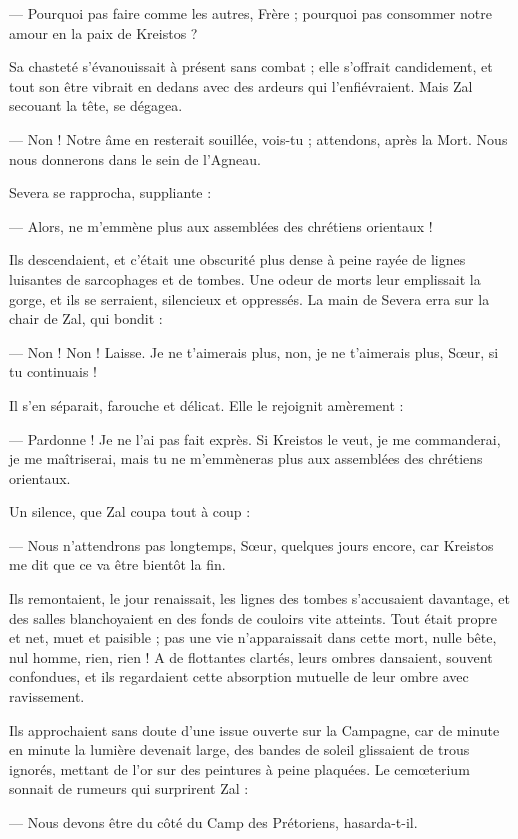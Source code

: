 \documentclass[a4paper, 11pt, oneside, polutonikogreek, french]{article}
\begin{document}
--- Pourquoi pas faire comme les autres, Frère ; pourquoi pas consommer notre amour en la paix de Kreistos ?

Sa chasteté s'évanouissait à présent sans combat ; elle s'offrait candidement, et tout son être vibrait en dedans avec des ardeurs qui l'enfiévraient. Mais Zal secouant la tête, se dégagea.

--- Non ! Notre âme en resterait souillée, vois-tu ; attendons, après la Mort. Nous nous donnerons dans le sein de l'Agneau.

Severa se rapprocha, suppliante :

--- Alors, ne m'emmène plus aux assemblées des chrétiens orientaux !

Ils descendaient, et c'était une obscurité plus dense à peine rayée de lignes luisantes de sarcophages et de tombes. Une odeur de morts leur emplissait la gorge, et ils se serraient, silencieux et oppressés. La main de Severa erra sur la chair de Zal, qui bondit :

--- Non ! Non ! Laisse. Je ne t'aimerais plus, non, je ne t'aimerais plus, Sœur, si tu continuais !

Il s'en séparait, farouche et délicat. Elle le rejoignit amèrement :

--- Pardonne ! Je ne l'ai pas fait exprès. Si Kreistos le veut, je me commanderai, je me maîtriserai, mais tu ne m'emmèneras plus aux assemblées des chrétiens orientaux.

Un silence, que Zal coupa tout à coup :

--- Nous n'attendrons pas longtemps, Sœur, quelques jours encore, car Kreistos me dit que ce va être bientôt la fin.

Ils remontaient, le jour renaissait, les lignes des tombes s'accusaient davantage, et des salles blanchoyaient en des fonds de couloirs vite atteints. Tout était propre et net, muet et paisible ; pas une vie n'apparaissait dans cette mort, nulle bête, nul homme, rien, rien ! A de flottantes clartés, leurs ombres dansaient, souvent confondues, et ils regardaient cette absorption mutuelle de leur ombre avec ravissement.

Ils approchaient sans doute d'une issue ouverte sur la Campagne, car de minute en minute la lumière devenait large, des bandes de soleil glissaient de trous ignorés, mettant de l'or sur des peintures à peine plaquées. Le cemœterium sonnait de rumeurs qui surprirent Zal :

--- Nous devons être du côté du Camp des Prétoriens, hasarda-t-il.
\end{document}
